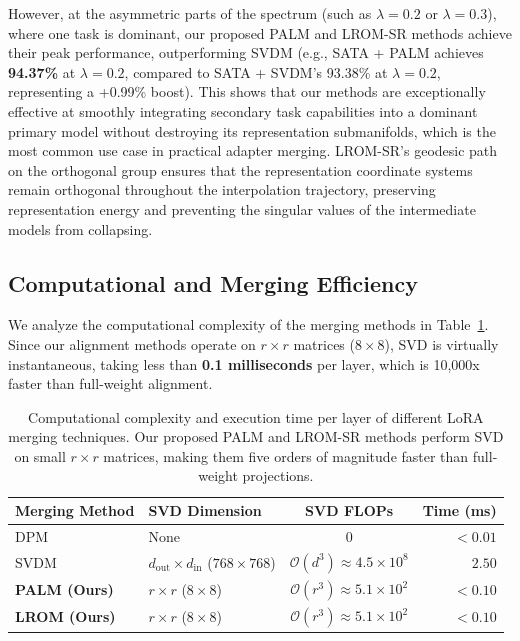 \documentclass{article}
\theoremstyle{plain}
\theoremstyle{definition}
\theoremstyle{remark}
\begin{document}
However, at the asymmetric parts of the spectrum (such as $\lambda = 0.2$ or $\lambda = 0.3$), where one task is dominant, our proposed PALM and LROM-SR methods achieve their peak performance, outperforming SVDM (e.g., SATA + PALM achieves \textbf{94.37\%} at $\lambda = 0.2$, compared to SATA + SVDM's 93.38\% at $\lambda=0.2$, representing a +0.99\% boost). This shows that our methods are exceptionally effective at smoothly integrating secondary task capabilities into a dominant primary model without destroying its representation submanifolds, which is the most common use case in practical adapter merging. LROM-SR's geodesic path on the orthogonal group ensures that the representation coordinate systems remain orthogonal throughout the interpolation trajectory, preserving representation energy and preventing the singular values of the intermediate models from collapsing.

\subsection{Computational and Merging Efficiency}
We analyze the computational complexity of the merging methods in Table~\ref{tab:complexity}. Since our alignment methods operate on $r \times r$ matrices ($8 \times 8$), SVD is virtually instantaneous, taking less than \textbf{0.1 milliseconds} per layer, which is 10,000x faster than full-weight alignment.

\begin{table}[tb]
\caption{Computational complexity and execution time per layer of different LoRA merging techniques. Our proposed PALM and LROM-SR methods perform SVD on small $r \times r$ matrices, making them five orders of magnitude faster than full-weight projections.}
\label{tab:complexity}
\begin{center}
\begin{small}
\begin{tabular}{llcr}
\toprule
\textbf{Merging Method} & \textbf{SVD Dimension} & \textbf{SVD FLOPs} & \textbf{Time (ms)} \\
\midrule
DPM & None & 0 & $<0.01$ \\
SVDM & $d_{\text{out}} \times d_{\text{in}}$ ($768 \times 768$) & $\mathcal{O}(d^3) \approx 4.5 \times 10^8$ & $2.50$ \\
\textbf{PALM (Ours)} & $r \times r$ ($8 \times 8$) & $\mathcal{O}(r^3) \approx 5.1 \times 10^2$ & $<0.10$ \\
\textbf{LROM (Ours)} & $r \times r$ ($8 \times 8$) & $\mathcal{O}(r^3) \approx 5.1 \times 10^2$ & $<0.10$ \\
\bottomrule
\end{tabular}
\end{small}
\end{center}
\end{table}
\end{document}
